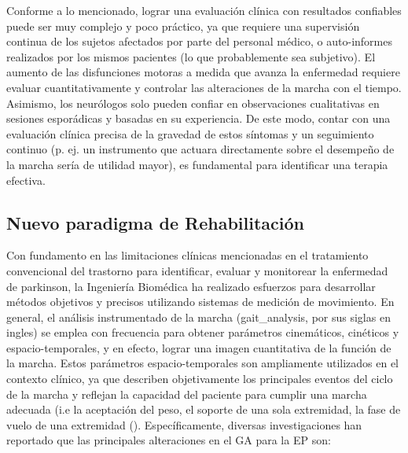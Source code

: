 Conforme a lo mencionado, lograr una evaluación clínica con resultados confiables puede ser muy complejo y poco práctico, ya que requiere una supervisión continua de los sujetos afectados por parte del personal médico, o auto-informes realizados por los mismos pacientes (lo que probablemente sea subjetivo). El aumento de las disfunciones motoras a medida que avanza la enfermedad requiere evaluar cuantitativamente y controlar las alteraciones de la marcha con el tiempo. Asimismo, los neurólogos solo pueden confiar en observaciones cualitativas en sesiones esporádicas y basadas en su experiencia. De este modo, contar con una evaluación clínica precisa de la gravedad de estos síntomas y un seguimiento continuo (p. ej. un instrumento que actuara directamente sobre el desempeño de la marcha sería de utilidad mayor), es fundamental para identificar una terapia efectiva.

 
\subsection{Nuevo paradigma de Rehabilitación}

Con fundamento en las limitaciones clínicas mencionadas en el tratamiento convencional del trastorno para identificar, evaluar y monitorear la enfermedad de parkinson, la Ingeniería Biomédica ha realizado esfuerzos para desarrollar métodos objetivos y precisos utilizando sistemas de medición de movimiento. En general, el análisis instrumentado de la marcha (\gls{gait_analysis}, por sus siglas en ingles) se emplea con frecuencia para obtener parámetros cinemáticos, cinéticos y espacio-temporales, y en efecto, lograr una imagen cuantitativa de la función de la marcha. Estos parámetros espacio-temporales son ampliamente utilizados en el contexto clínico, ya que describen objetivamente los principales eventos del ciclo de la marcha y reflejan la capacidad del paciente para cumplir una marcha adecuada (i.e la aceptación del peso, el soporte de una sola extremidad, la fase de vuelo de una extremidad (\cite{BUGANE2012129}). Específicamente, diversas investigaciones han reportado que las principales alteraciones en el GA para la EP son: 

